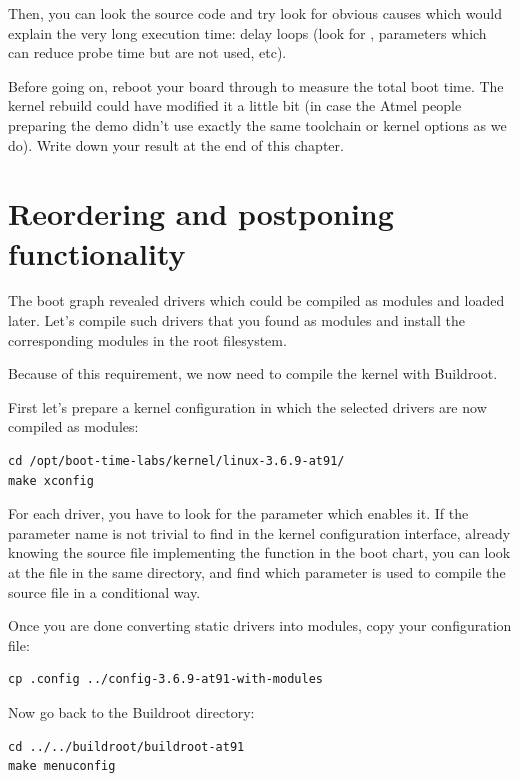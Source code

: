 Then, you can look the source code and try look for obvious causes which
would explain the very long execution time: delay loops (look for
, parameters which can reduce probe time but are not used,
etc).

Before going on, reboot your board through  to measure
the total boot time. The kernel rebuild could have modified it a little
bit (in case the Atmel people preparing the demo didn't use exactly the same toolchain
or kernel options as we do). Write down your result at the end of this
chapter.

\section{Reordering and postponing functionality}

The boot graph revealed drivers which could be compiled as modules
and loaded later.  Let's compile such drivers that you found as modules
and install the corresponding modules in the root filesystem.

Because of this requirement, we now need to compile the kernel with
Buildroot.

First let's prepare a kernel configuration in which the selected
drivers are now compiled as modules:

\begin{verbatim}
cd /opt/boot-time-labs/kernel/linux-3.6.9-at91/
make xconfig
\end{verbatim}

For each driver, you have to look for the parameter which enables it.
If the parameter name is not trivial to find in the kernel configuration
interface, already knowing the source file implementing
the function in the boot chart, you can look at
the  file in the same directory, and find which
parameter is used to compile the source file in a conditional way.

Once you are done converting static drivers into modules,
copy your configuration file:

\begin{verbatim}
cp .config ../config-3.6.9-at91-with-modules
\end{verbatim}

Now go back to the Buildroot directory:

\begin{verbatim}
cd ../../buildroot/buildroot-at91
make menuconfig
\end{verbatim}

